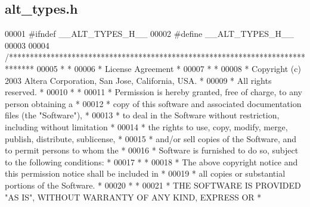 \subsection{alt\+\_\+types.\+h}
\label{alt__types_8h_source}

\begin{DoxyCode}
00001 \textcolor{preprocessor}{#ifndef \_\_ALT\_TYPES\_H\_\_}
00002 \textcolor{preprocessor}{#define \_\_ALT\_TYPES\_H\_\_}
00003 
00004 \textcolor{comment}{/******************************************************************************}
00005 \textcolor{comment}{*                                                                             *}
00006 \textcolor{comment}{* License Agreement                                                           *}
00007 \textcolor{comment}{*                                                                             *}
00008 \textcolor{comment}{* Copyright (c) 2003 Altera Corporation, San Jose, California, USA.           *}
00009 \textcolor{comment}{* All rights reserved.                                                        *}
00010 \textcolor{comment}{*                                                                             *}
00011 \textcolor{comment}{* Permission is hereby granted, free of charge, to any person obtaining a     *}
00012 \textcolor{comment}{* copy of this software and associated documentation files (the "Software"),  *}
00013 \textcolor{comment}{* to deal in the Software without restriction, including without limitation   *}
00014 \textcolor{comment}{* the rights to use, copy, modify, merge, publish, distribute, sublicense,    *}
00015 \textcolor{comment}{* and/or sell copies of the Software, and to permit persons to whom the       *}
00016 \textcolor{comment}{* Software is furnished to do so, subject to the following conditions:        *}
00017 \textcolor{comment}{*                                                                             *}
00018 \textcolor{comment}{* The above copyright notice and this permission notice shall be included in  *}
00019 \textcolor{comment}{* all copies or substantial portions of the Software.                         *}
00020 \textcolor{comment}{*                                                                             *}
00021 \textcolor{comment}{* THE SOFTWARE IS PROVIDED "AS IS", WITHOUT WARRANTY OF ANY KIND, EXPRESS OR  *}

\end{DoxyCode}
